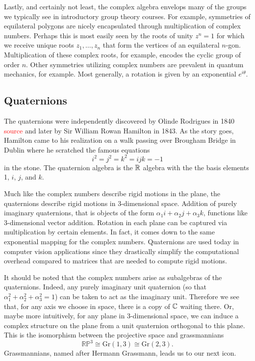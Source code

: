 \documentclass[12pt]{article}
\begin{document}
Lastly, and certainly not least, the complex algebra envelops many of the groups we typically see in introductory group theory courses. For example, symmetries of equilateral polygons are nicely encapsulated through multiplication of complex numbers. Perhaps this is most easily seen by the roots of unity $z^n=1$ for which we receive unique roots $z_1,\dots,z_n$ that form the vertices of an equilateral $n$-gon. Multiplication of these complex roots, for example, encodes the cyclic group of order $n$. Other symmetries utilizing complex numbers are prevalent in quantum mechanics, for example. Most generally, a rotation is given by an exponential $e^{i\theta}$.

\subsection{Quaternions}

The quaternions were independently discovered by Olinde Rodrigues in 1840 \textcolor{red}{source} and later by Sir William Rowan Hamilton in 1843. As the story goes, Hamilton came to his realization on a walk passing over Brougham Bridge in Dublin where he scratched the famous equations
\begin{equation}
\label{eq:hamiltons}
i^2=j^2=k^2=ijk=-1
\end{equation}
in the stone. The quaternion algebra is the $\mathbb{R}$ algebra with the the basis elements 1, $i$, $j$, and $k$.

Much like the complex numbers describe rigid motions in the plane, the quaternions describe rigid motions in 3-dimensional space. Addition of purely imaginary quaternions, that is objects of the form $\alpha_1 i + \alpha_2 j + \alpha_3 k$, functions like 3-dimensional vector addition. Rotation in each plane can be captured via multiplication by certain elements. In fact, it comes down to the same exponential mapping for the complex numbers. Quaternions are used today in computer vision applications since they drastically simplify the computational overhead compared to matrices that are needed to compute rigid motions. 

It should be noted that the complex numbers arise as subalgebras of the quaternions. Indeed, any purely imaginary unit quaternion (so that $\alpha_1^2+\alpha_2^2+\alpha_3^2=1$) can be taken to act as the imaginary unit. Therefore we see that, for any axis we choose in space, there is a copy of $\mathbb{C}$ waiting there. Or, maybe more intuitively, for any plane in 3-dimensional space, we can induce a complex structure on the plane from a unit quaternion orthogonal to this plane. This is the isomorphism between the projective space and grassmannians 
\begin{equation}
\label{eq:isomorphisms}
\mathbb{RP}^3\cong \mathrm{Gr}(1,3)\cong \mathrm{Gr}(2,3).
\end{equation}
Grassmannians, named after Hermann Grassmann, leads us to our next icon.
\end{document}
